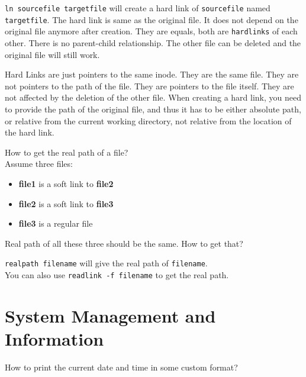 \begin{ans}
  \texttt{ln sourcefile targetfile} will create a hard link of \texttt{sourcefile}
  named \texttt{targetfile}. The hard link is same as the original file. It does
  not depend on the original file anymore after creation. They are equals,
  both are \texttt{hardlinks} of each other. There is no parent-child relationship.
  The other file can be deleted and the original file will still work.
\end{ans}

\begin{definition}
  Hard Links are just pointers to the same inode. They are the same file.
  They are not pointers to the path of the file. They are pointers to the
  file itself. They are not affected by the deletion of the other file.
  When creating a hard link, you need to provide the path of the original
  file, and thus it has to be either absolute path, or relative from the
  current working directory, not relative from the location of the hard link.
\end{definition}

\begin{qs}
  How to get the real path of a file?\\
  Assume three files:
  \begin{itemize}
    \item \textbf{file1} is a soft link to \textbf{file2}
    \item \textbf{file2} is a soft link to \textbf{file3}
    \item \textbf{file3} is a regular file
  \end{itemize}
  Real path of all these three should be the same. How to get that?
\end{qs}

\begin{ans}
  \texttt{realpath filename} will give the real path of \texttt{filename}. \\
  You can also use \texttt{readlink -f filename} to get the real path.
\end{ans}

\section{System Management and Information}

\begin{qs}
  How to print the current date and time in some custom format?
\end{qs}

